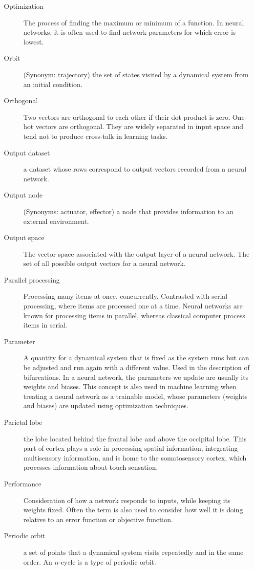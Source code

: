 \begin{description}
\item[Optimization] The process of finding the maximum or minimum of a function. In neural networks, it is often used to find network parameters for which error is lowest.
\item[Orbit] (Synonym: trajectory) the set of states visited by a dynamical system from an initial condition. 
\item[Orthogonal] Two vectors are orthogonal to each other if their dot product is zero. One-hot vectors are orthogonal. They are widely separated in input space and tend not to produce cross-talk in learning tasks.
\item[Output dataset] a dataset whose rows correspond to output vectors recorded from a neural network. 
\item[Output node] (Synonyms: actuator, effector) a node that provides information to an external environment. 
\item[Output space] The vector space associated with the output layer of a neural network. The set of all possible output vectors for a neural network.
\item[Parallel processing] Processing many items at once, concurrently. Contrasted with serial processing, where items are processed one at a time.  Neural networks are known for processing items in parallel, whereas classical computer process items in serial.
\item[Parameter] A quantity for a dynamical system that is fixed as the system runs but can be adjusted and run again with a different value. Used in the description of bifurcations. In a neural network, the parameters we  update are usually its weights and biases. This concept is also used in machine learning when treating a neural network as a trainable model, whose parameters (weights and biases) are updated using optimization techniques.
\item[Parietal lobe] the lobe located behind the frontal lobe and above the occipital lobe. This part of cortex plays a role in processing spatial information, integrating multisensory information, and is home to the somatosensory cortex, which processes information about touch sensation.
\item[Performance] Consideration of how a network responds to inputs, while keeping its weights fixed.  Often the term is also used to consider how well it is doing relative to an error function or objective function.
\item[Periodic orbit] a set of points that a dynamical system visits repeatedly and in the same order. An $n$-cycle is a type of periodic orbit.

\end{description}
